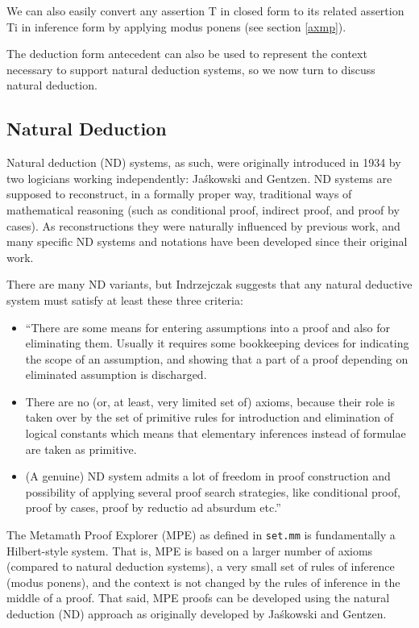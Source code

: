 We can also easily convert any assertion T in closed form to its related
assertion Ti in inference form by applying
modus ponens (see section \ref{axmp}).

The deduction form antecedent can also be used to represent the context
necessary to support natural deduction systems, so we now
turn to discuss natural deduction.

\subsection{Natural Deduction}

Natural deduction
(ND) systems, as such, were originally introduced in
1934 by two logicians working independently: Jaśkowski and Gentzen. ND
systems are supposed to reconstruct, in a formally proper way, traditional
ways of mathematical reasoning (such as conditional proof, indirect proof,
and proof by cases). As reconstructions they were naturally influenced
by previous work, and many specific ND systems and notations have been
developed since their original work.

There are many ND variants, but
Indrzejczak\cite[p.~31-32]{Indrzejczak}
suggests that any natural deductive system must satisfy at
least these three criteria:

\begin{itemize}
\item ``There are some means for entering assumptions into a proof and
also for eliminating them. Usually it requires some bookkeeping devices
for indicating the scope of an assumption, and showing that a part of
a proof depending on eliminated assumption is discharged.
\item There are no (or, at least, very limited set of) axioms, because
their role is taken over by the set of primitive rules for introduction
and elimination of logical constants which means that elementary
inferences instead of formulae are taken as primitive.
\item (A genuine) ND system admits a lot of freedom in proof construction
and possibility of applying several proof search strategies, like
conditional proof, proof by cases, proof by reductio ad absurdum etc.''
\end{itemize}

The Metamath Proof Explorer (MPE) as defined in \texttt{set.mm}
is fundamentally a Hilbert-style system.
That is, MPE is based on a larger number of axioms (compared
to natural deduction systems), a very small set of rules of inference
(modus ponens), and the context is not changed by the rules of inference
in the middle of a proof. That said, MPE proofs can be developed using
the natural deduction (ND) approach as originally developed by Jaśkowski
and Gentzen.

